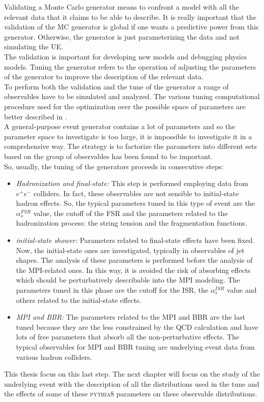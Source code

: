 Validating a Monte Carlo generator means to confront a model with all the relevant data that it claims to be able to describe. It is really important that the validation of the MC generator is global if one wants a predictive power from this generator. Otherwise, the generator is just parameterizing the data and not simulating the UE. 
\\
The validation is important for developing new models and debugging physics models. 
Tuning the generator refers to the operation of adjusting the parameters of the generator to improve the description of the relevant data.
\\
To perform both the validation and the tune of the generator a range of observables have to be simulated and analyzed. The various tuning computational procedure used for the optimization over the possible space of parameters are better described in .
\\
A general-purpose event generator contains a lot of parameters and so the parameter space to investigate is too large, it is impossible to investigate it in a comprehensive way. The strategy is to factorize the parameters into different sets based on the group of observables has been found to be important.
\\
So, usually, the tuning of the generators proceeds in consecutive steps:
\begin{itemize}
	\item \textit{Hadronization and final-state:} This step is performed employing data from $e^+e^-$ colliders. In fact, these observables are not sensible to initial-state hadron effects. So, the typical parameters tuned in this type of event are the $\alpha_s^{FSR}$ value, the cutoff of the FSR and the parameters related to the hadronization process: the string tension and the fragmentation functions.
	\item \textit{initial-state shower:} Parameters related to final-state effects have been fixed. Now, the initial-state ones are investigated, typically in observables of jet shapes. The analysis of these parameters is performed before the analysis of the MPI-related ones. In this way, it is avoided the risk of absorbing effects which should be perturbatively describable into the MPI modeling. The parameters tuned in this phase are the cutoff for the ISR, the $\alpha_s^{ISR}$ value and others related to the initial-state effects.
	\item \textit{MPI and BBR:} The parameters related to the MPI and BBR are the last tuned because they are the less constrained by the QCD calculation and have lots of free parameters that absorb all the non-perturbative effects.  
The typical observables for MPI and BBR tuning  are underlying event data from various hadron colliders. 	
\end{itemize}
This thesis focus on this last step. The next chapter will focus on the study of the underlying event with the description of all the distributions used in the tune and the effects of some of these \textsc{pythia}8 parameters on these observable distributions. 

